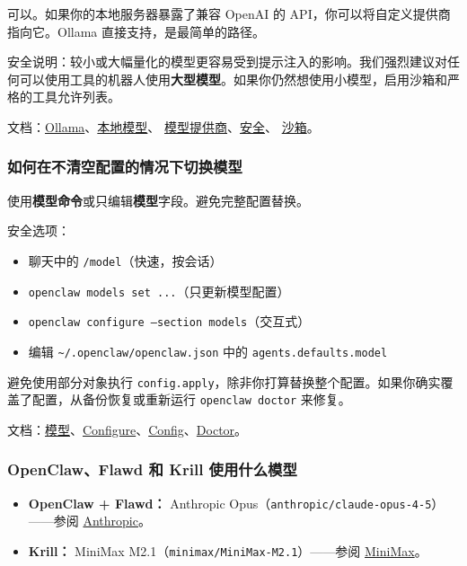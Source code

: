 可以。如果你的本地服务器暴露了兼容 OpenAI 的 API，你可以将自定义提供商指向它。Ollama 直接支持，是最简单的路径。

安全说明：较小或大幅量化的模型更容易受到提示注入的影响。我们强烈建议对任何可以使用工具的机器人使用\textbf{大型模型}。如果你仍然想使用小模型，启用沙箱和严格的工具允许列表。

文档：\href{/providers/ollama}{Ollama}、\href{/gateway/local-models}{本地模型}、
\href{/concepts/model-providers}{模型提供商}、\href{/gateway/security}{安全}、
\href{/gateway/sandboxing}{沙箱}。

\subsubsection{如何在不清空配置的情况下切换模型}


使用\textbf{模型命令}或只编辑\textbf{模型}字段。避免完整配置替换。

安全选项：

\begin{itemize}
  \item 聊天中的 \texttt{/model}（快速，按会话）
  \item \texttt{openclaw models set ...}（只更新模型配置）
  \item \texttt{openclaw configure --section models}（交互式）
  \item 编辑 \texttt{\textasciitilde{}/.openclaw/openclaw.json} 中的 \texttt{agents.defaults.model}
\end{itemize}


避免使用部分对象执行 \texttt{config.apply}，除非你打算替换整个配置。如果你确实覆盖了配置，从备份恢复或重新运行 \texttt{openclaw doctor} 来修复。

文档：\href{/concepts/models}{模型}、\href{/cli/configure}{Configure}、\href{/cli/config}{Config}、\href{/gateway/doctor}{Doctor}。

\subsubsection{OpenClaw、Flawd 和 Krill 使用什么模型}


\begin{itemize}
  \item \textbf{OpenClaw + Flawd：} Anthropic Opus（\texttt{anthropic/claude-opus-4-5}）——参阅 \href{/providers/anthropic}{Anthropic}。
  \item \textbf{Krill：} MiniMax M2.1（\texttt{minimax/MiniMax-M2.1}）——参阅 \href{/providers/minimax}{MiniMax}。
\end{itemize}


